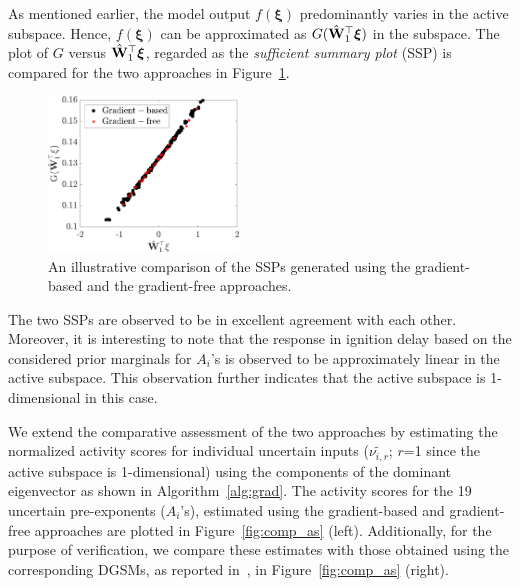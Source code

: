 As mentioned earlier, the model output $f(\bm{\xi})$ predominantly varies in the active subspace. Hence, 
$f(\bm{\xi})$ can be approximated as $G(\hat{\mathbf{{W}}}_1^\top\bm{\xi})$ in
the subspace. The plot of $G$ versus $\hat{\mathbf{{W}}}_1^\top\bm{\xi}$, regarded as the \textit{sufficient summary plot} (SSP) is 
compared for the two approaches in Figure~\ref{fig:comp_ssp}.
%
\begin{figure}[htbp]
 \begin{center}
  \includegraphics[width=0.45\textwidth]{./Figures/comp_ssp}
\caption{An illustrative comparison of the SSPs generated using the gradient-based and the gradient-free approaches.}
\label{fig:comp_ssp}
\end{center}
\end{figure}
%
The two SSPs are observed to be in excellent agreement with each other. Moreover, it is interesting to note
that the response in ignition
delay based on the considered prior marginals for $A_i$'s is observed to be approximately linear in the
active subspace. This observation further indicates that the active subspace is 1-dimensional in this case.

We extend the comparative assessment of the two approaches by estimating
the normalized activity scores for individual uncertain inputs ($\tilde{\nu_{i,r}}$; $r$=1 since the
active subspace is 1-dimensional)
using the components of the dominant eigenvector as shown in Algorithm~\ref{alg:grad}.
The activity scores for the 19 uncertain pre-exponents ($A_i$'s), estimated
using the gradient-based and gradient-free approaches are plotted in
Figure~\ref{fig:comp_as} (left).  Additionally, for the purpose of
verification, we compare these estimates with those obtained using the
corresponding DGSMs, as reported in~\cite{Vohra:2018}, in
Figure~\ref{fig:comp_as} (right). 


